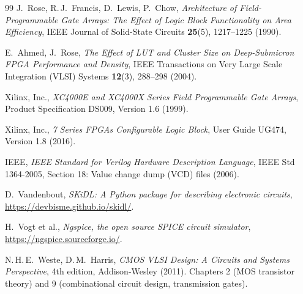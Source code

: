 \documentclass[11pt,a4paper]{article}
\begin{document}
\begin{thebibliography}{99}
 J.~Rose, R.\,J.~Francis, D.~Lewis, P.~Chow,
\emph{Architecture of Field-Programmable Gate Arrays: The Effect of
Logic Block Functionality on Area Efficiency},
IEEE Journal of Solid-State Circuits \textbf{25}(5), 1217--1225 (1990).

 E.~Ahmed, J.~Rose,
\emph{The Effect of LUT and Cluster Size on Deep-Submicron FPGA
Performance and Density},
IEEE Transactions on Very Large Scale Integration (VLSI) Systems
\textbf{12}(3), 288--298 (2004).

 Xilinx, Inc.,
\emph{XC4000E and XC4000X Series Field Programmable Gate Arrays},
Product Specification DS009, Version 1.6 (1999).

 Xilinx, Inc.,
\emph{7 Series FPGAs Configurable Logic Block},
User Guide UG474, Version 1.8 (2016).

 IEEE,
\emph{IEEE Standard for Verilog Hardware Description Language},
IEEE Std 1364-2005, Section 18: Value change dump (VCD) files (2006).

 D.~Vandenbout,
\emph{SKiDL: A Python package for describing electronic circuits},
\url{https://devbisme.github.io/skidl/}.

 H.~Vogt et al.,
\emph{Ngspice, the open source SPICE circuit simulator},
\url{https://ngspice.sourceforge.io/}.

 N.\,H.\,E.~Weste, D.\,M.~Harris,
\emph{CMOS VLSI Design: A Circuits and Systems Perspective},
4th edition, Addison-Wesley (2011). Chapters 2 (MOS transistor
theory) and 9 (combinational circuit design, transmission gates).

\end{thebibliography}
\end{document}
